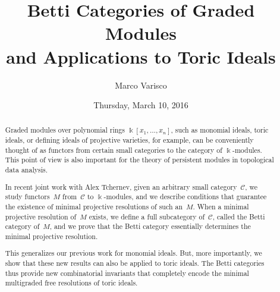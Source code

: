 \documentclass{UAmathtalk}
\author{Marco Varisco}
\title{Betti Categories of Graded Modules\\ and Applications to Toric Ideals}
\date{Thursday, March 10, 2016}
\begin{document}
\maketitle

\begin{abstract}
Graded modules over polynomial rings $\Bbbk[x_1,\dotsc,x_n]$, such as monomial ideals, toric ideals, or defining ideals of projective varieties, for example, can be conveniently thought of as functors from certain small categories to the category of $\Bbbk$-modules.
This point of view is also important for the theory of persistent modules in topological data analysis.

In recent joint work with Alex Tchernev, given an arbitrary small category~$\mathcal{C}$, we study functors~$M$ from~$\mathcal{C}$ to $\Bbbk$-modules, and we describe conditions that guarantee the existence of minimal projective resolutions of such an~$M$.
When a minimal projective resolution of~$M$ exists, we define a full subcategory of~$\mathcal{C}$, called the Betti category of~$M$, and we prove that the Betti category essentially determines the minimal projective resolution.

This generalizes our previous work for monomial ideals.
But, more importantly, we show that these new results can also be applied to toric ideals.
The Betti categories thus provide new combinatorial invariants that completely encode the minimal multigraded free resolutions of toric ideals.
\end{abstract}
\end{document}
